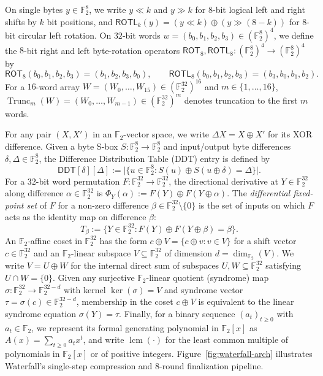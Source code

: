 \documentclass[11pt,a4paper]{article}
\theoremstyle{definition}
\theoremstyle{remark}
\newcommand{\Ftwo}{\mathbb{F}_2}
\newcommand{\ROT}{\mathsf{ROT}_8}
\newcommand{\ROTL}{\mathsf{ROTL}_8}
\newcommand{\Trunc}{\operatorname{Trunc}}
\newcommand{\lcm}{\operatorname{lcm}}
\begin{document}
On single bytes $y \in \Ftwo^8$, we write $y \ll k$ and $y \gg k$ for $8$-bit logical left and right shifts by $k$ bit positions, and $\mathsf{ROTL}_k(y) = (y \ll k) \oplus (y \gg (8-k))$ for $8$-bit circular left rotation. On $32$-bit words $w = (b_0, b_1, b_2, b_3) \in (\Ftwo^8)^4$, we define the $8$-bit right and left byte-rotation operators $\ROT, \ROTL : (\Ftwo^8)^4 \to (\Ftwo^8)^4$ by
\[
\ROT(b_0, b_1, b_2, b_3) = (b_1, b_2, b_3, b_0), \qquad \ROTL(b_0, b_1, b_2, b_3) = (b_3, b_0, b_1, b_2).
\]
For a $16$-word array $W = (W_0, \dots, W_{15}) \in (\Ftwo^{32})^{16}$ and $m \in \{1, \dots, 16\}$, $\Trunc_m(W) = (W_0, \dots, W_{m-1}) \in (\Ftwo^{32})^m$ denotes truncation to the first $m$ words.

For any pair $(X, X')$ in an $\Ftwo$-vector space, we write $\Delta X = X \oplus X'$ for its XOR difference. Given a byte S-box $S : \Ftwo^8 \to \Ftwo^8$ and input/output byte differences $\delta, \Delta \in \Ftwo^8$, the Difference Distribution Table (DDT) entry is defined by~\cite{BihamShamir,Nyberg}
\[
\mathsf{DDT}[\delta][\Delta] := \big|\big\{ u \in \Ftwo^8 : S(u) \oplus S(u \oplus \delta) = \Delta \big\}\big|.
\]
For a $32$-bit word permutation $F : \Ftwo^{32} \to \Ftwo^{32}$, the directional derivative at $Y \in \Ftwo^{32}$ along difference $\alpha \in \Ftwo^{32}$ is $\Phi_Y(\alpha) := F(Y) \oplus F(Y \oplus \alpha)$. The \emph{differential fixed-point set} of $F$ for a non-zero difference $\beta \in \Ftwo^{32} \setminus \{0\}$ is the set of inputs on which $F$ acts as the identity map on difference $\beta$:
\[
T_\beta := \big\{ Y \in \Ftwo^{32} : F(Y) \oplus F(Y \oplus \beta) = \beta \big\}.
\]
An $\Ftwo$-affine coset in $\Ftwo^{32}$ has the form $c \oplus V = \{c \oplus v : v \in V\}$ for a shift vector $c \in \Ftwo^{32}$ and an $\Ftwo$-linear subspace $V \subseteq \Ftwo^{32}$ of dimension $d = \dim_{\Ftwo}(V)$. We write $V = U \oplus W$ for the internal direct sum of subspaces $U, W \subseteq \Ftwo^{32}$ satisfying $U \cap W = \{0\}$. Given any surjective $\Ftwo$-linear quotient (syndrome) map $\sigma : \Ftwo^{32} \to \Ftwo^{32-d}$ with kernel $\ker(\sigma) = V$ and syndrome vector $\tau = \sigma(c) \in \Ftwo^{32-d}$, membership in the coset $c \oplus V$ is equivalent to the linear syndrome equation $\sigma(Y) = \tau$. Finally, for a binary sequence $(a_t)_{t \ge 0}$ with $a_t \in \Ftwo$, we represent its formal generating polynomial in $\Ftwo[x]$ as $A(x) = \sum_{t \ge 0} a_t x^t$, and write $\lcm(\cdot)$ for the least common multiple of polynomials in $\Ftwo[x]$ or of positive integers. Figure~\ref{fig:waterfall-arch} illustrates Waterfall's single-step compression and $8$-round finalization pipeline.
\end{document}

